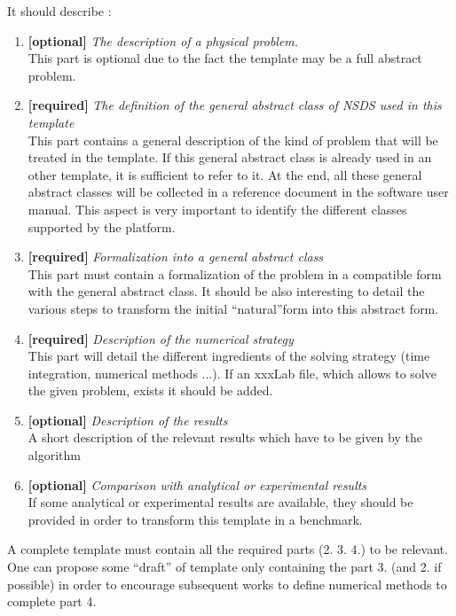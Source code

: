 \documentclass[10pt]{article}
\begin{document}
It should describe :
\begin{enumerate}
\item {\bf [optional]} \textit{The description of a  physical problem.}\\
  This part is optional due to the fact the template may be a full abstract problem.


\item {\bf [required]} \textit{The definition of the general abstract class of NSDS used in this template }\\
   This part contains a general description of the kind of problem that will be treated in the template.
   If this general abstract class is already used in an other template, it is sufficient to refer to it. At the end, all these general abstract classes will be collected in a reference document in the software user manual. This aspect is very important to identify the different classes supported by the platform. 


\item {\bf [required]} \textit{Formalization into a general abstract class}\\
  This part must contain a formalization of the problem in a compatible form with the general abstract class. It should be also interesting to detail the various steps to transform the initial ``natural''form into this abstract form.       
\item {\bf [required]} \textit{Description of the numerical strategy}\\
This part will detail the different ingredients of the solving strategy (time integration, numerical methods ...). If an xxxLab file, which allows to solve the given problem, exists it should be added. 

\item {\bf [optional]} \textit{Description of the results}\\
A short description of the relevant results which have to be given by the algorithm

\item {\bf [optional]} \textit{Comparison with analytical or experimental results}\\
If some analytical or experimental results are available, they should be provided in order to transform this template in a benchmark.

\end{enumerate}

A complete template must contain all the required parts (2. 3. 4.) to be relevant. One can propose some ``draft'' of template only containing the part 3. (and 2. if possible)  in order to encourage subsequent works to define numerical methods to complete  part 4.
\end{document}
